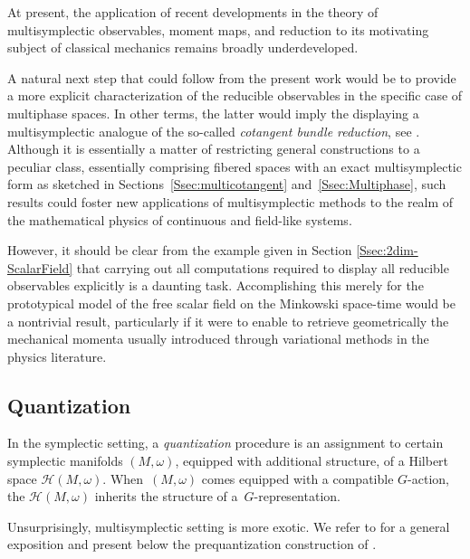 \documentclass[10pt,a4paper]{amsart}
\numberwithin{equation}{section}
\begin{document}
At present, the application of recent developments in the theory of multisymplectic observables, moment maps, and reduction to its motivating subject of classical mechanics remains broadly underdeveloped.

A natural next step that could follow from the present work would be to provide a more explicit characterization of the reducible observables in the specific case of multiphase spaces.
In other terms, the latter would imply the displaying a multisymplectic analogue of the so-called \emph{cotangent bundle reduction}, see \cite{MarsdenMisiolekOrtegaPerlmutterRatiu07,OrtegaRatiu06}.
Although it is essentially a matter of restricting general constructions to a peculiar class, essentially comprising fibered spaces with an exact multisymplectic form as sketched in Sections~\ref{Ssec:multicotangent} and~\ref{Ssec:Multiphase}, such results could foster new applications of multisymplectic methods to the realm of the mathematical physics of continuous and field-like systems.

However, it should be clear from the example given in Section \ref{Ssec:2dim-ScalarField} that carrying out all computations required to display all reducible observables explicitly is a daunting task.
Accomplishing this merely for the prototypical model of the free scalar field on the Minkowski space-time would be a nontrivial result, particularly if it were to enable to retrieve geometrically the mechanical momenta usually introduced through variational methods in the physics literature.


\subsection{Quantization}

In the symplectic setting, a \emph{quantization} procedure is an assignment to certain symplectic manifolds $(M,\omega)$, equipped with additional structure, of a Hilbert space $\mathcal{H}(M,\omega)$. When~$(M,\omega)$ comes equipped with a compatible $G$-action, the $\mathcal{H}(M,\omega)$ inherits the structure of a~$G$-repre\-sentation.

Unsurprisingly, multisymplectic setting is more exotic. We refer to \cite{Schreiber21} for a general exposition and present below the prequantization construction of \cite{FiorenzaRogersSchreiber14,FiorenzaRogersSchreiber16}.
\end{document}

